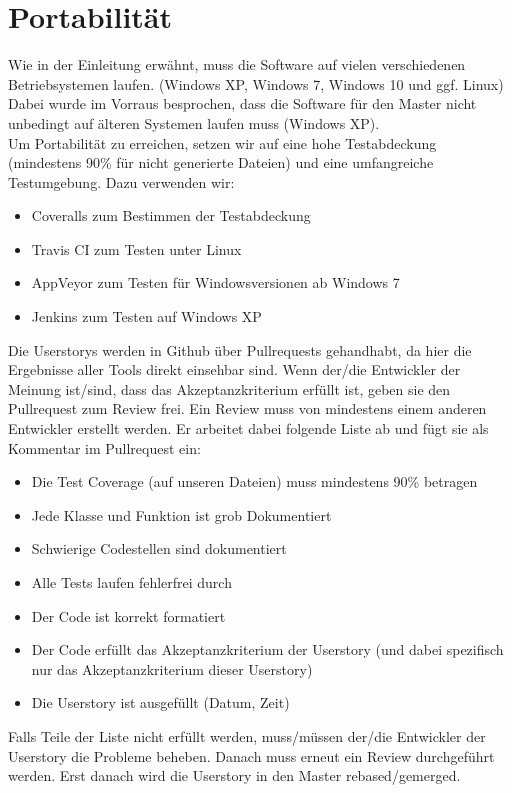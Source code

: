\documentclass[accentcolor=tud9c,12pt,paper=a4]{tudreport}
\begin{document}
		\section{Portabilität}
		Wie in der Einleitung erwähnt, muss die Software auf vielen verschiedenen 
		Betriebsystemen laufen. (Windows XP, Windows 7, Windows 10 und ggf. Linux)
		Dabei wurde im Vorraus besprochen, dass die Software für den Master nicht 
		unbedingt auf älteren Systemen laufen muss (Windows XP).
		\\[5pt]
		Um Portabilität zu erreichen, setzen wir auf eine hohe Testabdeckung 
		(mindestens 90\% für nicht generierte Dateien) und eine umfangreiche 
		Testumgebung. Dazu verwenden wir:
		\begin{itemize}	
			\item Coveralls zum Bestimmen der Testabdeckung
			\item Travis CI zum Testen unter Linux
			\item AppVeyor zum Testen für Windowsversionen ab Windows 7
			\item Jenkins zum Testen auf Windows XP
		\end{itemize}
		Die Userstorys werden in Github über Pullrequests gehandhabt, da hier die 
		Ergebnisse aller Tools direkt einsehbar sind. Wenn der/die Entwickler der Meinung 
		ist/sind, dass das Akzeptanzkriterium erfüllt ist, geben 
		sie den Pullrequest zum Review frei. Ein Review muss von mindestens einem anderen 
		Entwickler erstellt werden. Er arbeitet dabei folgende Liste ab und fügt sie als 
		Kommentar im Pullrequest ein:
		\begin{itemize}	
			\item Die Test Coverage (auf unseren Dateien) muss mindestens 90\% betragen
			\item Jede Klasse und Funktion ist grob Dokumentiert
			\item Schwierige Codestellen sind dokumentiert
			\item Alle Tests laufen fehlerfrei durch
			\item Der Code ist korrekt formatiert
			\item Der Code erfüllt das Akzeptanzkriterium der Userstory (und dabei 
			spezifisch nur das Akzeptanzkriterium dieser Userstory)
			\item Die Userstory ist ausgefüllt (Datum, Zeit)
		\end{itemize}
		Falls Teile der Liste nicht erfüllt werden, muss/müssen der/die Entwickler 
		der Userstory die Probleme beheben. Danach muss erneut ein Review 
		durchgeführt werden. Erst danach wird die Userstory in den Master rebased/gemerged.
				
\end{document}
